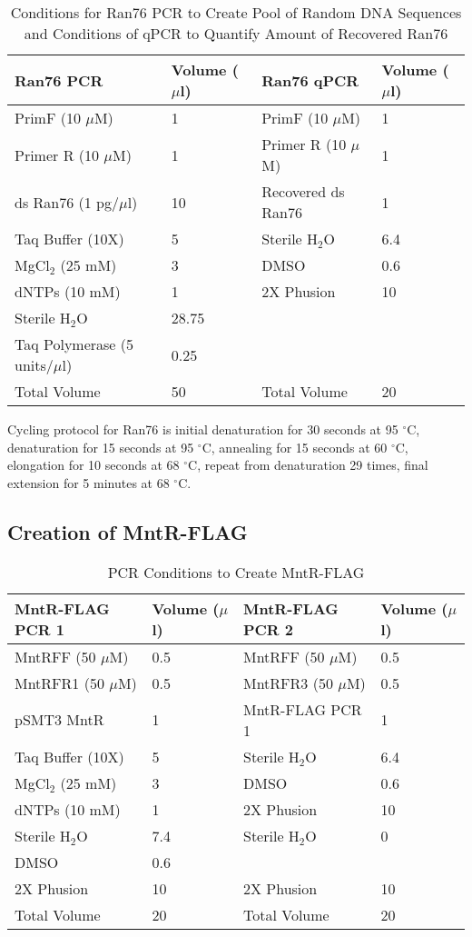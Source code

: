 \documentclass[12pt,twoside]{reedthesis}
\begin{document}
\begin{table}[H]
	\caption{Conditions for Ran76 PCR to Create Pool of Random DNA Sequences and Conditions of qPCR to Quantify Amount of Recovered Ran76} 
	\label{Ran76PCRandqPCR}
	\begin{tabular}{|l | l| |l| l|}
		\hline
		Ran76 PCR & Volume ($\mu$l) & Ran76 qPCR & Volume ($\mu$l) \\
		\hline 
		PrimF (10 $\mu$M) & 1 & PrimF (10 $\mu$M) & 1   \\ 
		Primer R (10 $\mu$M) & 1  & Primer R (10 $\mu$M) & 1  \\  			
		ds Ran76 (1 pg/$\mu$l) & 10  & Recovered ds Ran76 &  1  \\
		Taq Buffer (10X) & 5 & Sterile H$_{2}$O & 6.4 \\ 
		MgCl$_{2}$ (25 mM) & 3 & DMSO & 0.6 \\  
		dNTPs (10 mM) & 1 & 2X Phusion & 10 \\     
		Sterile H$_{2}$O & 28.75  & & \\
		Taq Polymerase (5 units/$\mu$l) & 0.25 & & \\
		\hline   
		Total Volume & 50 & Total Volume & 20  \\
		\hline
	\end{tabular}
\end{table}

Cycling protocol for Ran76 is initial denaturation for 30 seconds at 95 $^{\circ}$C, denaturation for 15 seconds at 95 $^{\circ}$C, annealing for 15 seconds at 60 $^{\circ}$C, elongation for 10 seconds at 68 $^{\circ}$C, repeat from denaturation 29 times, final extension for 5 minutes at 68 $^{\circ}$C. 

 \subsection{Creation of MntR-FLAG}

\begin{table}[H]
	\caption{PCR Conditions to Create MntR-FLAG} 
	\label{MntRFLAGPCR}
	\begin{tabular}{|l | l| |l| l|}
		\hline
		MntR-FLAG PCR 1 & Volume ($\mu$l) & MntR-FLAG PCR 2  & Volume ($\mu$l) \\
		\hline 
		MntRFF (50 $\mu$M) & 0.5 & MntRFF (50 $\mu$M) & 0.5   \\ 
		MntRFR1 (50 $\mu$M) & 0.5 & MntRFR3 (50 $\mu$M) & 0.5 \\  			
		pSMT3 MntR & 1  & MntR-FLAG PCR 1 &  1  \\
		Taq Buffer (10X) & 5 & Sterile H$_{2}$O & 6.4 \\ 
		MgCl$_{2}$ (25 mM) & 3 & DMSO & 0.6 \\  
		dNTPs (10 mM) & 1 & 2X Phusion & 10 \\     
		Sterile H$_{2}$O & 7.4  & Sterile H$_{2}$O & 0  \\
		DMSO & 0.6 &  &  \\
		2X Phusion & 10 & 2X Phusion & 10 \\
		\hline   
		Total Volume & 20 & Total Volume & 20  \\
		\hline
	\end{tabular}
\end{table}
\end{document}
